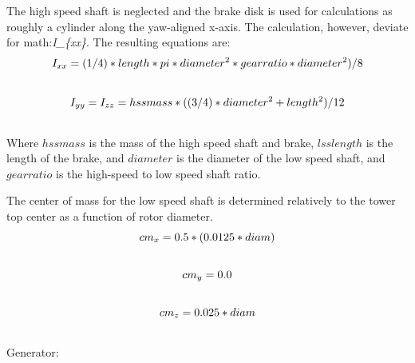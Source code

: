\documentclass[letterpaper,10pt,openany,oneside]{sphinxmanual}
\begin{document}
The high speed shaft is neglected and the brake disk is used for calculations as roughly a cylinder along the yaw-aligned x-axis.  The calculation, however, deviate for math:\emph{I\_\{xx\}}.  The resulting equations are:
\begin{gather}
\begin{split}I_{xx}=(1/4) * length * pi * diameter^2 * gearratio * diameter^2) / 8\end{split}\notag\\\begin{split}\end{split}\notag
\end{gather}\begin{gather}
\begin{split}I_{yy}=I_{zz}= hssmass * ((3/4) * diameter^2 + length^2) / 12\end{split}\notag\\\begin{split}\end{split}\notag
\end{gather}
Where $hssmass$ is the mass of the high speed shaft and brake, $lsslength$ is the length of the brake, and $diameter$ is the diameter of the low speed shaft, and $gearratio$ is the high-speed to low speed shaft ratio.

The center of mass for the low speed shaft is determined relatively to the tower top center as a function of rotor diameter.
\begin{gather}
\begin{split}cm_{x} = 0.5 * (0.0125 * diam)\end{split}\notag\\\begin{split}\end{split}\notag
\end{gather}\begin{gather}
\begin{split}cm_{y} = 0.0\end{split}\notag\\\begin{split}\end{split}\notag
\end{gather}\begin{gather}
\begin{split}cm_{z} = 0.025 * diam\end{split}\notag\\\begin{split}\end{split}\notag
\end{gather}
Generator:
\end{document}
